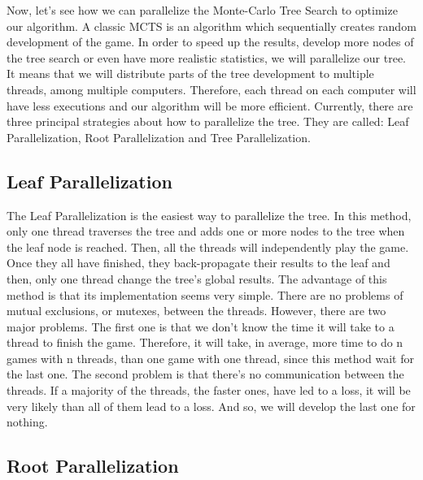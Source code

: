 Now, let’s see how we can parallelize the Monte-Carlo Tree Search to optimize our algorithm. A classic MCTS is an algorithm which sequentially creates random development of the game. In order to speed up the results, develop more nodes of the tree search or even have more realistic statistics, we will parallelize our tree. It means that we will distribute parts of the tree development to multiple threads, among multiple computers. Therefore, each thread on each computer will have less executions and our algorithm will be more efficient.
\newline
\newline
Currently, there are three principal strategies about how to parallelize the tree. They are called: Leaf Parallelization, Root Parallelization and Tree Parallelization.

\subsection{Leaf Parallelization}

The Leaf Parallelization is the easiest way to parallelize the tree. In this method, only one thread traverses the tree and adds one or more nodes to the tree when the leaf node is reached. Then, all the threads will independently play the game. Once they all have finished, they back-propagate their results to the leaf and then, only one thread change the tree’s global results.
\newline
\newline
The advantage of this method is that its implementation seems very simple. There are no problems of mutual exclusions, or mutexes, between the threads. However, there are two major problems. The first one is that we don’t know the time it will take to a thread to finish the game. Therefore, it will take, in average, more time to do n games with n threads, than one game with one thread, since this method wait for the last one. The second problem is that there’s no communication between the threads. If a majority of the threads, the faster ones, have led to a loss, it will be very likely than all of them lead to a loss. And so, we will develop the last one for nothing.

\subsection{Root Parallelization}

